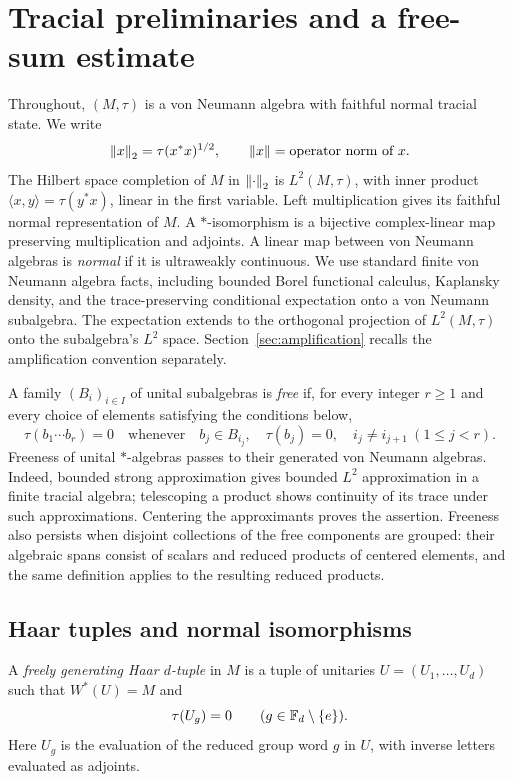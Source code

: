 \section{Tracial preliminaries and a free-sum estimate}\label{sec:prelim}
Throughout, $(M,\tau)$ is a von Neumann algebra with faithful normal tracial state. We write
\[
 \left\lVert x\right\rVert_2=\tau(x^*x)^{1/2},\qquad \left\lVert x\right\rVert=\text{operator norm of }x.
\]
The Hilbert space completion of $M$ in $\left\lVert \cdot\right\rVert_2$ is $L^2(M,\tau)$, with inner product $\langle x,y\rangle=\tau(y^*x)$, linear in the first variable. Left multiplication gives its faithful normal representation of $M$. A $*$-isomorphism is a bijective complex-linear map preserving multiplication and adjoints. A linear map between von Neumann algebras is \emph{normal} if it is ultraweakly continuous. We use standard finite von Neumann algebra facts, including bounded Borel functional calculus, Kaplansky density, and the trace-preserving conditional expectation onto a von Neumann subalgebra. The expectation extends to the orthogonal projection of $L^2(M,\tau)$ onto the subalgebra's $L^2$ space. Section~\ref{sec:amplification} recalls the amplification convention separately.

A family $(B_i)_{i\in I}$ of unital subalgebras is \emph{free} if, for every integer $r\geq1$ and every choice of elements satisfying the conditions below,
\[
 \tau(b_1\cdots b_r)=0
 \quad\text{whenever}\quad
 b_j\in B_{i_j},\quad \tau(b_j)=0,\quad
 i_j\ne i_{j+1}\ (1\leq j<r).
\]
Freeness of unital $*$-algebras passes to their generated von Neumann algebras. Indeed, bounded strong approximation gives bounded $L^2$ approximation in a finite tracial algebra; telescoping a product shows continuity of its trace under such approximations. Centering the approximants proves the assertion. Freeness also persists when disjoint collections of the free components are grouped: their algebraic spans consist of scalars and reduced products of centered elements, and the same definition applies to the resulting reduced products.

\subsection{Haar tuples and normal isomorphisms}
\begin{definition}
A \emph{freely generating Haar $d$-tuple} in $M$ is a tuple of unitaries $U=(U_1,\ldots,U_d)$ such that $W^*(U)=M$ and
\[
 \tau(U_g)=0\qquad(g\in\mathbb F_d\setminus\{e\}).
\]
Here $U_g$ is the evaluation of the reduced group word $g$ in $U$, with inverse letters evaluated as adjoints.
\end{definition}

